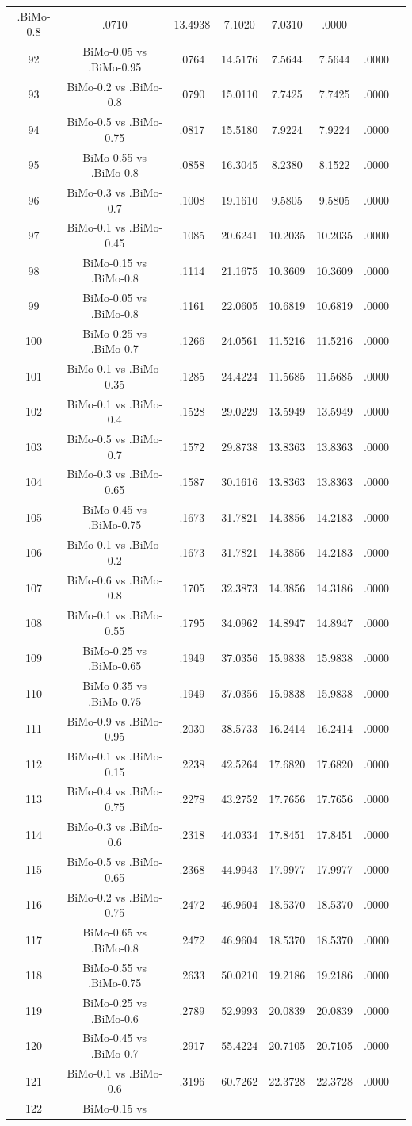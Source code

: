 \documentclass[a4paper,10pt]{article}
\begin{document}
\begin{landscape}
\begin{table}[!htp]
\begin{tabular}{cccccccc}
.BiMo-0.8&.0710&13.4938&7.1020&7.0310&.0000\\92&BiMo-0.05 vs .BiMo-0.95&.0764&14.5176&7.5644&7.5644&.0000\\93&BiMo-0.2 vs .BiMo-0.8&.0790&15.0110&7.7425&7.7425&.0000\\94&BiMo-0.5 vs .BiMo-0.75&.0817&15.5180&7.9224&7.9224&.0000\\95&BiMo-0.55 vs .BiMo-0.8&.0858&16.3045&8.2380&8.1522&.0000\\96&BiMo-0.3 vs .BiMo-0.7&.1008&19.1610&9.5805&9.5805&.0000\\97&BiMo-0.1 vs .BiMo-0.45&.1085&20.6241&10.2035&10.2035&.0000\\98&BiMo-0.15 vs .BiMo-0.8&.1114&21.1675&10.3609&10.3609&.0000\\99&BiMo-0.05 vs .BiMo-0.8&.1161&22.0605&10.6819&10.6819&.0000\\100&BiMo-0.25 vs .BiMo-0.7&.1266&24.0561&11.5216&11.5216&.0000\\101&BiMo-0.1 vs .BiMo-0.35&.1285&24.4224&11.5685&11.5685&.0000\\102&BiMo-0.1 vs .BiMo-0.4&.1528&29.0229&13.5949&13.5949&.0000\\103&BiMo-0.5 vs .BiMo-0.7&.1572&29.8738&13.8363&13.8363&.0000\\104&BiMo-0.3 vs .BiMo-0.65&.1587&30.1616&13.8363&13.8363&.0000\\105&BiMo-0.45 vs .BiMo-0.75&.1673&31.7821&14.3856&14.2183&.0000\\106&BiMo-0.1 vs .BiMo-0.2&.1673&31.7821&14.3856&14.2183&.0000\\107&BiMo-0.6 vs .BiMo-0.8&.1705&32.3873&14.3856&14.3186&.0000\\108&BiMo-0.1 vs .BiMo-0.55&.1795&34.0962&14.8947&14.8947&.0000\\109&BiMo-0.25 vs .BiMo-0.65&.1949&37.0356&15.9838&15.9838&.0000\\110&BiMo-0.35 vs .BiMo-0.75&.1949&37.0356&15.9838&15.9838&.0000\\111&BiMo-0.9 vs .BiMo-0.95&.2030&38.5733&16.2414&16.2414&.0000\\112&BiMo-0.1 vs .BiMo-0.15&.2238&42.5264&17.6820&17.6820&.0000\\113&BiMo-0.4 vs .BiMo-0.75&.2278&43.2752&17.7656&17.7656&.0000\\114&BiMo-0.3 vs .BiMo-0.6&.2318&44.0334&17.8451&17.8451&.0000\\115&BiMo-0.5 vs .BiMo-0.65&.2368&44.9943&17.9977&17.9977&.0000\\116&BiMo-0.2 vs .BiMo-0.75&.2472&46.9604&18.5370&18.5370&.0000\\117&BiMo-0.65 vs .BiMo-0.8&.2472&46.9604&18.5370&18.5370&.0000\\118&BiMo-0.55 vs .BiMo-0.75&.2633&50.0210&19.2186&19.2186&.0000\\119&BiMo-0.25 vs .BiMo-0.6&.2789&52.9993&20.0839&20.0839&.0000\\120&BiMo-0.45 vs .BiMo-0.7&.2917&55.4224&20.7105&20.7105&.0000\\121&BiMo-0.1 vs .BiMo-0.6&.3196&60.7262&22.3728&22.3728&.0000\\122&BiMo-0.15 vs 
\end{tabular}
\end{table}
\end{landscape}
\end{document}

